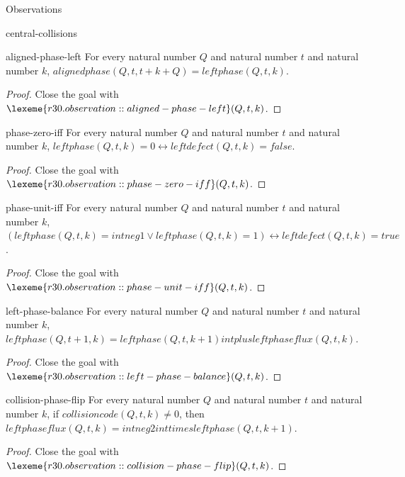 \begin{lexlean}{Observations}
\begin{section}{central-collisions}
\begin{theorem}{aligned-phase-left}
For every natural number \(Q\) and natural number \(t\) and natural number \(k\), \(alignedphase(Q, t, t + k + Q) = leftphase(Q, t, k)\).
\begin{proof}
Close the goal with \(\lexeme{r30.observation::aligned-phase-left}(Q, t, k)\).
\end{proof}
\end{theorem}

\begin{theorem}{phase-zero-iff}
For every natural number \(Q\) and natural number \(t\) and natural number \(k\), \(leftphase(Q, t, k) = 0 ↔ leftdefect(Q, t, k) = false\).
\begin{proof}
Close the goal with \(\lexeme{r30.observation::phase-zero-iff}(Q, t, k)\).
\end{proof}
\end{theorem}

\begin{theorem}{phase-unit-iff}
For every natural number \(Q\) and natural number \(t\) and natural number \(k\), \((leftphase(Q, t, k) = intneg 1 ∨ leftphase(Q, t, k) = 1) ↔ leftdefect(Q, t, k) = true\).
\begin{proof}
Close the goal with \(\lexeme{r30.observation::phase-unit-iff}(Q, t, k)\).
\end{proof}
\end{theorem}

\begin{theorem}{left-phase-balance}
For every natural number \(Q\) and natural number \(t\) and natural number \(k\), \(leftphase(Q, t + 1, k) = leftphase(Q, t, k + 1) intplus leftphaseflux(Q, t, k)\).
\begin{proof}
Close the goal with \(\lexeme{r30.observation::left-phase-balance}(Q, t, k)\).
\end{proof}
\end{theorem}

\begin{theorem}{collision-phase-flip}
For every natural number \(Q\) and natural number \(t\) and natural number \(k\), if \(collisioncode(Q, t, k) ≠ 0\), then \(leftphaseflux(Q, t, k) = intneg 2 inttimes leftphase(Q, t, k + 1)\).
\begin{proof}
Close the goal with \(\lexeme{r30.observation::collision-phase-flip}(Q, t, k)\).
\end{proof}
\end{theorem}


\end{section}
\end{lexlean}
